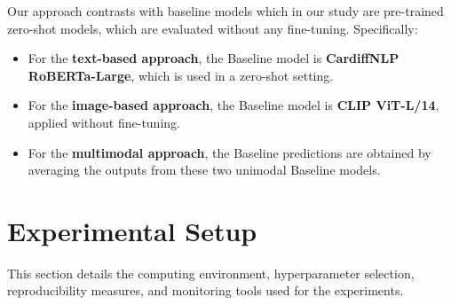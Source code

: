 \begin{table}[h]
    \centering
    \caption{Architectural Variations}
    \label{tab:architectural_variations}
\end{table}

Our approach contrasts with baseline models which in our study are pre-trained zero-shot models, which are evaluated without any fine-tuning. Specifically:

\begin{itemize}
    \item For the \textbf{text-based approach}, the Baseline model is \textbf{CardiffNLP RoBERTa-Large}, which is used in a zero-shot setting.
    \item For the \textbf{image-based approach}, the Baseline model is \textbf{CLIP ViT-L/14}, applied without fine-tuning.
    \item For the \textbf{multimodal approach}, the Baseline predictions are obtained by averaging the outputs from these two unimodal Baseline models.
\end{itemize}


\section{Experimental Setup}
\label{sec:Experimental Setup}
This section details the computing environment, hyperparameter selection, reproducibility measures, and monitoring tools used for the experiments.

